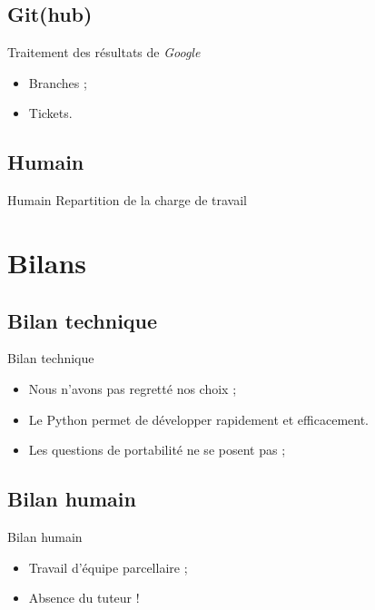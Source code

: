 \documentclass{beamer}
\begin{document}
\subsection{Git(hub)}
	\begin{frame}{Traitement des résultats de \emph{Google}}
		\begin{itemize}
		\setlength{\itemsep}{0.8cm}
			\item Branches ;
			\item Tickets.
		\end{itemize}
	\end{frame}
\subsection{Humain}
	\begin{frame}{Humain}
	    Repartition de la charge de travail
	\end{frame}


\section{Bilans}
\subsection{Bilan technique}
	\begin{frame}{Bilan technique}
		\begin{itemize}
		\setlength{\itemsep}{0.3cm}
			\item Nous n'avons pas regretté nos choix ;
			\item Le Python permet de développer rapidement et efficacement.
			\item Les questions de portabilité ne se posent pas ;
		\end{itemize}
	\end{frame}
\subsection{Bilan humain}
	\begin{frame}{Bilan humain}
		\begin{itemize}
			\item Travail d'équipe parcellaire ;
			\vspace{1cm}
			\item Absence du tuteur !
		\end{itemize}
	\end{frame}
\end{document}
